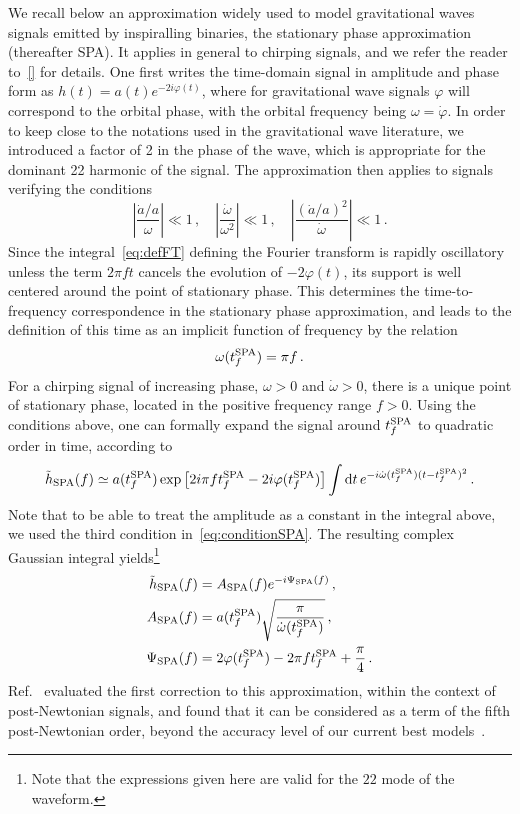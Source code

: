 \documentclass[aps,showpacs,%
prd,superscriptaddress,nofootinbib]{revtex4}
\newcommand{\be}{\begin{equation}}
\newcommand{\ee}{\end{equation}}
\newcommand\ud{{\mathrm{d}}}
\begin{document}
We recall below an approximation widely used to model gravitational waves signals emitted by inspiralling binaries, the stationary phase approximation (thereafter SPA). It applies in general to chirping signals, and we refer the reader to~\ref{} for details. One first writes the time-domain signal in amplitude and phase form as $h(t) = a(t) e^{-2i\varphi(t)}$, where for gravitational wave signals $\varphi$ will correspond to the orbital phase, with the orbital frequency being $\omega = \dot{\varphi}$. In order to keep close to the notations used in the gravitational wave literature, we introduced a factor of 2 in the phase of the wave, which is appropriate for the dominant 22 harmonic of the signal. The approximation then applies to signals verifying the conditions
%
\be\label{eq:conditionSPA}
	\left| \frac{\dot{a}/a}{\omega} \right| \ll 1\,, \quad \left|\frac{\dot{\omega}}{\omega^{2}} \right| \ll 1\,, \quad \left| \frac{(\dot{a}/a)^{2}}{\dot{\omega}} \right| \ll 1 \,.
\ee
%
Since the integral~\eqref{eq:defFT} defining the Fourier transform is rapidly oscillatory unless the term $2\pi f t$ cancels the evolution of $-2\varphi(t)$, its support is well centered around the point of stationary phase. This determines the time-to-frequency correspondence in the stationary phase approximation, and leads to the definition of this time as an implicit function of frequency by the relation
%
\be\label{eq:deftfSPA}
	\omega(t_{f}^{\rm SPA}) = \pi  f \,.
\ee
% 
For a chirping signal of increasing phase, $\omega>0$ and $\dot{\omega}>0$, there is a unique point of stationary phase, located in the positive frequency range $f>0$. Using the conditions above, one can formally expand the signal around $t_{f}^{\rm SPA}$ to quadratic order in time, according to
\be
	\tilde{h}_{\rm SPA} (f) \simeq a(t_{f}^{\rm SPA}) \exp\left[2i\pi f t_{f}^{\rm SPA}-2i\varphi(t_{f}^{\rm SPA}) \right]  \int \ud t \, e^{-i \dot{\omega} (t_{f}^{\rm SPA}) (t-t_{f}^{\rm SPA})^{2}} \,.
\ee
Note that to be able to treat the amplitude as a constant in the integral above, we used the third condition in~\eqref{eq:conditionSPA}. The resulting complex Gaussian integral yields\footnote{Note that the expressions given here are valid for the $22$ mode of the waveform.}
\begin{subequations}
\begin{align}
	\tilde{h}_{\rm SPA}(f) &= A_{\rm SPA}(f) e^{-i\Psi_{\rm SPA}(f)} \,, \\
	A_{\rm SPA}(f) &= a(t_{f}^{\rm SPA}) \sqrt{\frac{\pi}{\dot{\omega}(t_{f}^{\rm SPA})}} \,, \\
	\Psi_{\rm SPA}(f) &= 2\varphi(t_{f}^{\rm SPA}) - 2\pi f t_{f}^{\rm SPA} + \frac{\pi}{4} \,.
\end{align}
\end{subequations}
Ref.~\cite{Droz+99} evaluated the first correction to this approximation, within the context of post-Newtonian signals, and found that it can be considered as a term of the fifth post-Newtonian order, beyond the accuracy level of our current best models~\cite{BlanchetLiving}.
\end{document}
